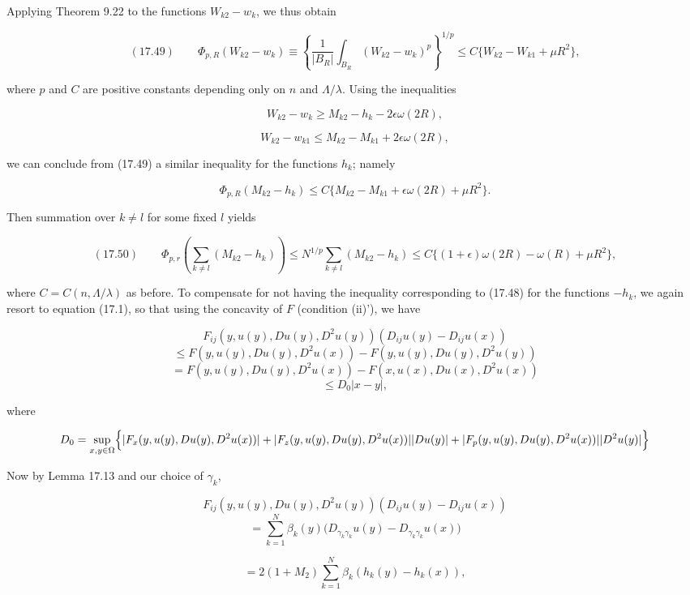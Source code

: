
Applying Theorem 9.22 to the functions $W_{k2}-w_{k}$, we thus obtain

\begin{equation}
(17.49)\qquad \Phi_{p,R}(W_{k2}-w_{k})\equiv \left\{\frac{1}{|B_{R}|}\int_{B_{R}}(W_{k2}-w_{k})^{p}\right\}^{1/p}\le C\{W_{k2}-W_{k1}+\mu R^{2}\},
\end{equation}

where $p$ and $C$ are positive constants depending only on $n$ and $\Lambda/\lambda$. Using the inequalities

\[
W_{k2}-w_{k}\ge M_{k2}-h_{k}-2\epsilon\omega(2R),
\]

\[
W_{k2}-w_{k1}\le M_{k2}-M_{k1}+2\epsilon\omega(2R),
\]

we can conclude from (17.49) a similar inequality for the functions $h_{k}$; namely

\[
\Phi_{p,R}(M_{k2}-h_{k})\le C\{M_{k2}-M_{k1}+\epsilon\omega(2R)+\mu R^{2}\}.
\]

Then summation over $k\neq l$ for some fixed $l$ yields

\begin{equation}
(17.50)\qquad \Phi_{p,r}\left(\sum_{k\neq l}(M_{k2}-h_{k})\right)\le N^{1/p}\sum_{k\neq l}(M_{k2}-h_{k})
\le C\{(1+\epsilon)\omega(2R)-\omega(R)+\mu R^{2}\},
\end{equation}

where $C=C(n,\Lambda/\lambda)$ as before. To compensate for not having the inequality corresponding to (17.48) for the functions $-h_{k}$, we again resort to equation (17.1), so that using the concavity of $F$ (condition (ii)'), we have

\[
F_{ij}(y,u(y),Du(y),D^{2}u(y))(D_{ij}u(y)-D_{ij}u(x))
\]
\[
\le F(y,u(y),Du(y),D^{2}u(x)) - F(y,u(y),Du(y),D^{2}u(y))
\]
\[
= F(y,u(y),Du(y),D^{2}u(x)) - F(x,u(x),Du(x),D^{2}u(x))
\]
\[
\le D_{0}|x-y|,
\]

where

\[
D_{0}=\sup_{x,y\in\Omega}\Bigl\{|F_{x}(y,u(y),Du(y),D^{2}u(x))|
+|F_{z}(y,u(y),Du(y),D^{2}u(x))||Du(y)|
+|F_{p}(y,u(y),Du(y),D^{2}u(x))||D^{2}u(y)|\Bigr\}
\]

Now by Lemma 17.13 and our choice of $\gamma_{k}$,

\[
F_{ij}(y,u(y),Du(y),D^{2}u(y))(D_{ij}u(y)-D_{ij}u(x))
\]
\[
= \sum_{k=1}^{N}\beta_{k}(y)\bigl(D_{\gamma_{k}\gamma_{k}}u(y)-D_{\gamma_{k}\gamma_{k}}u(x)\bigr)
\]

\[
= 2(1+M_{2})\sum_{k=1}^{N}\beta_{k}(h_{k}(y)-h_{k}(x)),
\]

